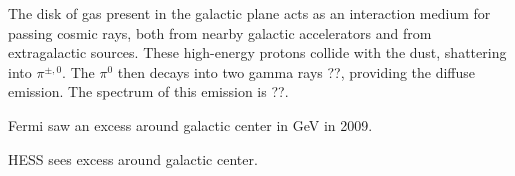 The disk of gas present in the galactic plane acts as an interaction medium for passing cosmic rays, both from nearby galactic accelerators and from extragalactic sources.
These high-energy protons collide with the dust, shattering into $\pi^{\pm,0}$.
The $\pi^0$ then decays into two gamma rays ??, providing the diffuse emission.
The spectrum of this emission is ??.

Fermi saw an excess around galactic center in GeV in 2009.

HESS sees excess around galactic center.


